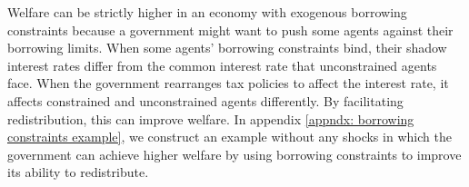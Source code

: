 \documentclass[thmsb,11pt]{article}
\begin{document}
Welfare can  be strictly higher in an economy  with exogenous
borrowing constraints  because  a government might want to
push some agents against their borrowing limits. When some agents' borrowing
constraints bind, their shadow interest rates differ from the
common interest rate that unconstrained agents face. When the government rearranges tax
policies to  affect the  interest rate, it affects constrained and unconstrained agents
 differently.  By facilitating
redistribution, this can improve welfare. %
In appendix \ref{appndx: borrowing constraints example}, we construct an example without any
shocks in which the government can achieve higher welfare by using borrowing
constraints to improve its ability to redistribute.
% 
\end{document}
